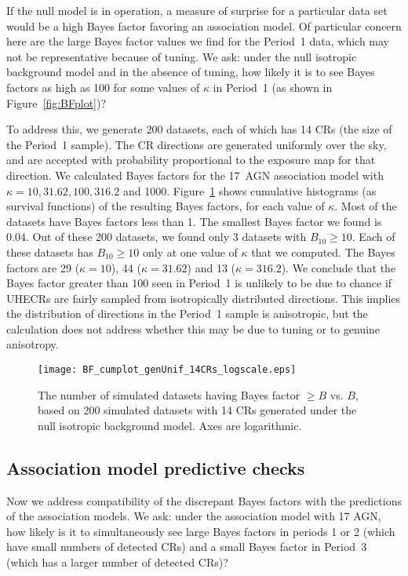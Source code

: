 If the null model is in operation, a measure of surprise for a particular data
set would be a high Bayes factor favoring an association model.  Of particular
concern here are the large Bayes factor values we find for the Period~1 data,
which may not be representative because of tuning.  We ask:  under the null
isotropic background model and in the absence of tuning, how likely it is to
see Bayes factors as high as 100 for some values of $\kappa$ in Period~1 (as
shown in Figure~\ref{fig:BFplot})?

To address this, we generate 200 datasets, each of which has 14 CRs (the
size of the Period~1 sample).  The CR
directions are generated uniformly over the sky, and are accepted with
probability proportional to the exposure map for that direction.  We
calculated Bayes factors for the 17~AGN association model with $\kappa = 10,
31.62, 100, 316.2$ and 1000.
Figure~\ref{fig:unifCumBF} shows cumulative histograms (as survival
functions) of the resulting Bayes factors, for each value of $\kappa$.  Most
of the datasets have Bayes factors less than 1. The smallest Bayes factor we
found is 0.04. Out of these 200 datasets, we found only 3 datasets with
$B_{10} \geq 10$.  Each of these datasets has $B_{10} \geq 10$ only at one
value of $\kappa$ that we computed. The Bayes factors are 29 ($\kappa=10$),
44 ($\kappa = 31.62$) and 13 ($\kappa = 316.2$).  We conclude that the Bayes
factor greater than 100 seen in Period~1 is unlikely to be due to chance if
UHECRs are fairly sampled from isotropically distributed directions.  This
implies the distribution of directions in the Period~1 sample is
anisotropic, but the calculation does not address whether this may be due to
tuning or to genuine anisotropy.

\begin{figure}
\centerline{\texttt{[image: BF\_cumplot\_genUnif\_14CRs\_logscale.eps]}}
\caption{The number of simulated datasets having Bayes factor $\geq B$
vs. $B$, based on 200 simulated datasets with 14 CRs generated under the
null isotropic background model.  Axes are logarithmic.}
\label{fig:unifCumBF}
\end{figure}

\subsection{Association model predictive checks}

Now we address compatibility of the discrepant Bayes factors with the
predictions of the association models.  We ask: under the association model
with 17 AGN, how likely is it to simultaneously see large Bayes factors in
periods 1 or 2 (which have small numbers of detected CRs) and a small Bayes
factor in Period~3 (which has a larger number of detected CRs)?

